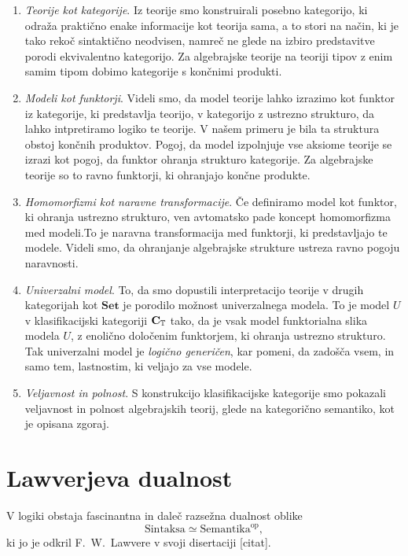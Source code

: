 \documentclass[../kategoricna_logika.tex]{subfiles}
\begin{document}
\begin{enumerate}
\item \emph{Teorije kot kategorije}. Iz teorije smo konstruirali posebno
  kategorijo, ki odraža praktično enake informacije kot teorija sama,
  a to stori na način, ki je tako rekoč sintaktično neodvisen, namreč
  ne glede na izbiro predstavitve porodi ekvivalentno kategorijo.
  Za algebrajske teorije na teoriji tipov z enim samim tipom dobimo
  kategorije s končnimi produkti.
\item \emph{Modeli kot funktorji}. Videli smo, da model teorije lahko izrazimo
  kot funktor iz kategorije, ki predstavlja teorijo, v kategorijo z ustrezno
  strukturo, da lahko intpretiramo logiko te teorije. V našem primeru
  je bila ta struktura obstoj končnih produktov. Pogoj, da model izpolnjuje
  vse aksiome teorije se izrazi kot pogoj, da funktor ohranja strukturo
  kategorije. Za algebrajske teorije so to ravno funktorji, ki ohranjajo
  končne produkte.
\item \emph{Homomorfizmi kot naravne transformacije}. Če definiramo model
  kot funktor, ki ohranja ustrezno strukturo, ven avtomatsko pade koncept
  homomorfizma med modeli.To je naravna transformacija med funktorji, ki
  predstavljajo te modele. Videli smo, da ohranjanje algebrajske strukture
  ustreza ravno pogoju naravnosti.
\item \emph{Univerzalni model}. To, da smo dopustili interpretacijo teorije
  v drugih kategorijah kot $\mathbf{Set}$ je porodilo možnost univerzalnega
  modela. To je model $U$ v klasifikacijski kategoriji ${\operatorname{\mathbf{C}}}_{\mathbb{T}}$ tako,
  da je vsak model funktorialna slika modela $U$, z enolično določenim
  funktorjem, ki ohranja ustrezno strukturo. Tak univerzalni model je
  \emph{logično generičen}, kar pomeni, da zadošča vsem, in samo tem,
  lastnostim, ki veljajo za vse modele.
\item \emph{Veljavnost in polnost}. S konstrukcijo klasifikacijske kategorije
  smo pokazali veljavnost in polnost algebrajskih teorij, glede na
  kategorično semantiko, kot je opisana zgoraj.
\end{enumerate}
% 
%
%
\section{Lawverjeva dualnost}
%
V logiki obstaja fascinantna in daleč razsežna dualnost oblike
\[ \mathrm{Sintaksa} \simeq \mathrm{Semantika}^{\mathrm{op}}, \]
ki jo je odkril F.~W.~Lawvere v svoji disertaciji [citat].
\end{document}
